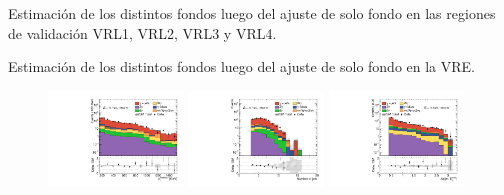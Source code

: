 \begin{table}[ht!]
  \centering
  \caption{Estimación de los distintos fondos luego del ajuste de solo fondo en las regiones de validación VRL1, VRL2, VRL3 y VRL4.}
  \resizebox{\textwidth}{!}{}
  \label{tab:bkgonly_result_vrl}
\end{table}

\begin{table}[ht!]
  \centering
  \caption{Estimación de los distintos fondos luego del ajuste de solo fondo en la VRE.}
  
  \label{tab:bkgonly_result_vre}
\end{table}

\begin{figure}[ht!]
  \centering

    \includegraphics[width=0.32\textwidth]{images/results/fr2_unblind/can_VRQ_ph_pt0_afterFit.pdf}
    \includegraphics[width=0.32\textwidth]{images/results/fr2_unblind/can_VRQ_jet_n_afterFit.pdf}
    \includegraphics[width=0.32\textwidth]{images/results/fr2_unblind/can_VRQ_dphi_jetmet_afterFit.pdf}


\end{figure}
